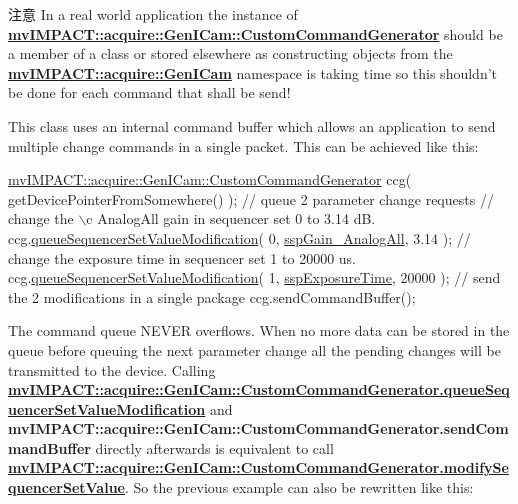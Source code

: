 \begin{DoxyAttention}{注意}
In a real world application the instance of {\bfseries \hyperlink{classmv_i_m_p_a_c_t_1_1acquire_1_1_gen_i_cam_1_1_custom_command_generator}{mv\+I\+M\+P\+A\+C\+T\+::acquire\+::\+Gen\+I\+Cam\+::\+Custom\+Command\+Generator}} should be a member of a class or stored elsewhere as constructing objects from the {\bfseries \hyperlink{namespacemv_i_m_p_a_c_t_1_1acquire_1_1_gen_i_cam}{mv\+I\+M\+P\+A\+C\+T\+::acquire\+::\+Gen\+I\+Cam}} namespace is taking time so this shouldn't be done for each command that shall be send!
\end{DoxyAttention}
This class uses an internal command buffer which allows an application to send multiple change commands in a single packet. This can be achieved like this\+:


\begin{DoxyCode}
\hyperlink{classmv_i_m_p_a_c_t_1_1acquire_1_1_gen_i_cam_1_1_custom_command_generator}{mvIMPACT::acquire::GenICam::CustomCommandGenerator} ccg( 
      getDevicePointerFromSomewhere() );
\textcolor{comment}{// queue 2 parameter change requests}
\textcolor{comment}{// change the \(\backslash\)c AnalogAll gain in sequencer set 0 to 3.14 dB.}
ccg.\hyperlink{classmv_i_m_p_a_c_t_1_1acquire_1_1_gen_i_cam_1_1_custom_command_generator_ae18cd9ce7775ddb997e2a7c1414ded60}{queueSequencerSetValueModification}( 0, 
      \hyperlink{group___gen_i_cam_interface_gga458c2281fb19ba32fa6a49b02e0a976da12982df75ec50ed03752228f5b9a5086}{sspGain\_AnalogAll}, 3.14 );
\textcolor{comment}{// change the exposure time in sequencer set 1 to 20000 us.}
ccg.\hyperlink{classmv_i_m_p_a_c_t_1_1acquire_1_1_gen_i_cam_1_1_custom_command_generator_ae18cd9ce7775ddb997e2a7c1414ded60}{queueSequencerSetValueModification}( 1, 
      \hyperlink{group___gen_i_cam_interface_gga458c2281fb19ba32fa6a49b02e0a976da23cbccf7c89a18488ab68d5c16fe7519}{sspExposureTime}, 20000 );
\textcolor{comment}{// send the 2 modifications in a single package}
ccg.sendCommandBuffer();
\end{DoxyCode}


The command queue N\+E\+V\+E\+R overflows. When no more data can be stored in the queue before queuing the next parameter change all the pending changes will be transmitted to the device. Calling {\bfseries \hyperlink{classmv_i_m_p_a_c_t_1_1acquire_1_1_gen_i_cam_1_1_custom_command_generator_ae18cd9ce7775ddb997e2a7c1414ded60}{mv\+I\+M\+P\+A\+C\+T\+::acquire\+::\+Gen\+I\+Cam\+::\+Custom\+Command\+Generator.\+queue\+Sequencer\+Set\+Value\+Modification}} and {\bfseries mv\+I\+M\+P\+A\+C\+T\+::acquire\+::\+Gen\+I\+Cam\+::\+Custom\+Command\+Generator.\+send\+Command\+Buffer} directly afterwards is equivalent to call {\bfseries \hyperlink{classmv_i_m_p_a_c_t_1_1acquire_1_1_gen_i_cam_1_1_custom_command_generator_ad692d5d184f37b146f3da67faf1da770}{mv\+I\+M\+P\+A\+C\+T\+::acquire\+::\+Gen\+I\+Cam\+::\+Custom\+Command\+Generator.\+modify\+Sequencer\+Set\+Value}}. So the previous example can also be rewritten like this\+:


